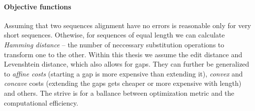 \paragraph{Objective functions}
Assuming that two sequences alignment have no errors is reasonable only for very
short sequences. Othewise, for sequences of equal length we can calculate
\emph{Hamming distance} -- the number of neccessary substitution operations to
transform one to the other. Within this thesis we assume the edit distance and
Levenshtein distance, which also allows for gaps. They can further be
generalized to \emph{affine costs} (starting a gap is more expensive than
extending it), \emph{convex} and \emph{concave} costs (extending the gaps gets
cheaper or more expensive with length) and others. The strive is for a ballance
between optimization metric and the computational efficiency.